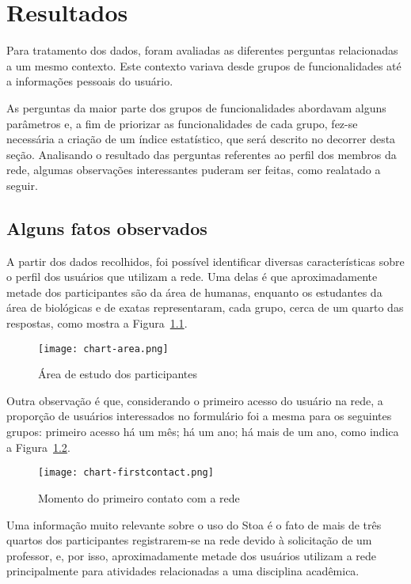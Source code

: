 \chapter{Resultados}
\label{cap:resultados}
    
    Para tratamento dos dados, foram avaliadas as diferentes perguntas relacionadas a um mesmo contexto. Este contexto variava desde grupos de funcionalidades até a informações pessoais do usuário. 
    
    As perguntas da maior parte dos grupos de funcionalidades abordavam alguns parâmetros e, a fim de priorizar as funcionalidades de cada grupo, fez-se necessária a criação de um índice estatístico, que será descrito no decorrer desta seção.  Analisando o resultado das perguntas referentes ao perfil dos membros da rede, algumas observações interessantes puderam ser feitas, como realatado a seguir.

\section{Alguns fatos observados}
\label{sec:observacoes}

    A partir dos dados recolhidos, foi possível identificar diversas características sobre o perfil dos usuários que utilizam a rede. Uma delas é que aproximadamente metade dos participantes são da área de humanas, enquanto os estudantes da área de biológicas e de exatas representaram, cada grupo, cerca de um quarto das respostas, como mostra a Figura~\ref{fig:chart-area}.
    
\begin{figure}[!h]
  \centering
  \texttt{[image: chart-area.png]} 
  \caption{Área de estudo dos participantes}
  \label{fig:chart-area} 
\end{figure}
Outra observação é que, considerando o primeiro acesso do usuário na rede, a proporção de usuários interessados no formulário foi a mesma para os seguintes grupos: primeiro acesso há um mês; há um ano; há mais de um ano, como indica a Figura~\ref{fig:chart-firstcontact}.
    
\begin{figure}[!h]
  \centering
  \texttt{[image: chart-firstcontact.png]} 
  \caption{Momento do primeiro contato com a rede}
  \label{fig:chart-firstcontact} 
\end{figure}
Uma informação muito relevante sobre o uso do Stoa é o fato de mais de três quartos dos participantes registrarem-se na rede devido à solicitação de um professor, e, por isso, aproximadamente metade dos usuários utilizam a rede principalmente para atividades relacionadas a uma disciplina acadêmica.

